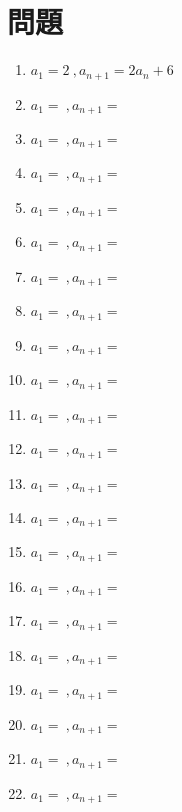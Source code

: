 \documentclass[platex,dvipdfmx]{jlreq}
\begin{document}
\section*{問題}
\begin{enumerate}[(1)   ]
  \item $a_1=2\ ,a_{n+1}=2a_n+6$
  \\
  \item $a_1=\ ,a_{n+1}=$
  \\
  \item $a_1=\ ,a_{n+1}=$
  \\
  \item $a_1=\ ,a_{n+1}=$
  \\
  \item $a_1=\ ,a_{n+1}=$
  \\
  \item $a_1=\ ,a_{n+1}=$
  \\
  \item $a_1=\ ,a_{n+1}=$
  \\
  \item $a_1=\ ,a_{n+1}=$
  \\
  \item $a_1=\ ,a_{n+1}=$
  \\
  \item $a_1=\ ,a_{n+1}=$
  \\
  \item $a_1=\ ,a_{n+1}=$
  \\
  \item $a_1=\ ,a_{n+1}=$
  \\
  \item $a_1=\ ,a_{n+1}=$
  \\
  \item $a_1=\ ,a_{n+1}=$
  \\
  \item $a_1=\ ,a_{n+1}=$
  \\
  \item $a_1=\ ,a_{n+1}=$
  \\
  \item $a_1=\ ,a_{n+1}=$
  \\
  \item $a_1=\ ,a_{n+1}=$
  \\
  \item $a_1=\ ,a_{n+1}=$
  \\
  \item $a_1=\ ,a_{n+1}=$
  \\
  \item $a_1=\ ,a_{n+1}=$
  \\
  \item $a_1=\ ,a_{n+1}=$

\end{enumerate}
\end{document}
